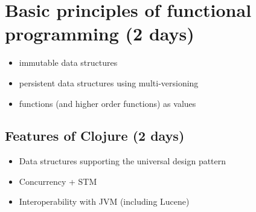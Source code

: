 \section{Basic principles of functional programming (2 days)}
	\begin{itemize}
		\item immutable data structures
		\item persistent data structures using multi-versioning
		\item functions (and higher order functions) as values
	\end{itemize}

	\subsection{Features of Clojure (2 days)}
		\begin{itemize}
			\item Data structures supporting the universal design pattern
			\item Concurrency + STM
			\item Interoperability with JVM (including Lucene)
		\end{itemize}